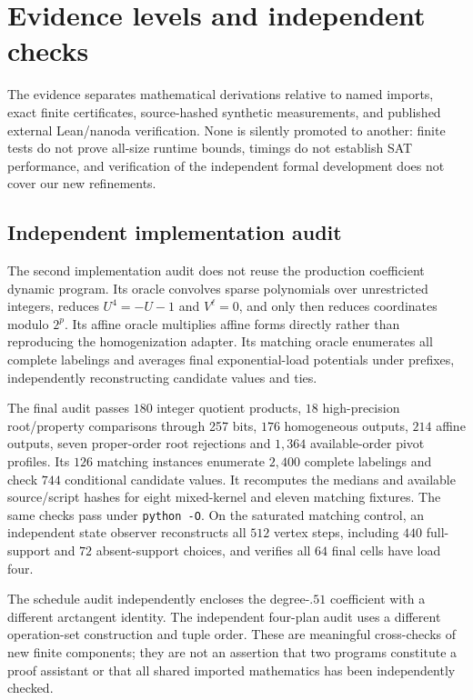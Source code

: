\documentclass[11pt,letterpaper]{article}
\theoremstyle{remark}\newtheorem{remark}[theorem]{Remark}
\begin{document}
\section{Evidence levels and independent checks}
\label{sec:evidence}
The evidence separates mathematical derivations relative to named imports, exact finite certificates, source-hashed synthetic measurements, and published external Lean/nanoda verification. None is silently promoted to another: finite tests do not prove all-size runtime bounds, timings do not establish SAT performance, and verification of the independent formal development does not cover our new refinements.

\subsection{Independent implementation audit}
The second implementation audit does not reuse the production coefficient dynamic program. Its oracle convolves sparse polynomials over unrestricted integers, reduces $U^4=-U-1$ and $V^\ell=0$, and only then reduces coordinates modulo $2^p$. Its affine oracle multiplies affine forms directly rather than reproducing the homogenization adapter. Its matching oracle enumerates all complete labelings and averages final exponential-load potentials under prefixes, independently reconstructing candidate values and ties.

The final audit passes $180$ integer quotient products, $18$ high-precision root/property comparisons through 257 bits, $176$ homogeneous outputs, $214$ affine outputs, seven proper-order root rejections and $1{,}364$ available-order pivot profiles. Its $126$ matching instances enumerate $2{,}400$ complete labelings and check $744$ conditional candidate values. It recomputes the medians and available source/script hashes for eight mixed-kernel and eleven matching fixtures. The same checks pass under \texttt{python -O}. On the saturated matching control, an independent state observer reconstructs all $512$ vertex steps, including $440$ full-support and $72$ absent-support choices, and verifies all $64$ final cells have load four.

The schedule audit independently encloses the degree-$.51$ coefficient with a different arctangent identity. The independent four-plan audit uses a different operation-set construction and tuple order. These are meaningful cross-checks of new finite components; they are not an assertion that two programs constitute a proof assistant or that all shared imported mathematics has been independently checked.
\end{document}
